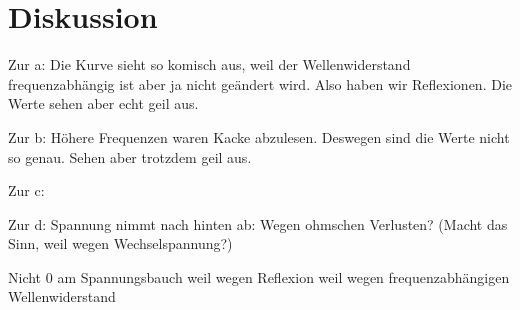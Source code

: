 \section{Diskussion}
\label{sec:Diskussion}

Zur a:
Die Kurve sieht so komisch aus, weil der Wellenwiderstand frequenzabhängig ist aber ja nicht geändert wird. Also haben wir Reflexionen.
Die Werte sehen aber echt geil aus.

Zur b:
Höhere Frequenzen waren Kacke abzulesen. Deswegen sind die Werte nicht so genau.
Sehen aber trotzdem geil aus.

Zur c:


Zur d:
Spannung nimmt nach hinten ab: Wegen ohmschen Verlusten? (Macht das Sinn, weil wegen Wechselspannung?)

Nicht 0 am Spannungsbauch weil wegen Reflexion weil wegen frequenzabhängigen Wellenwiderstand
